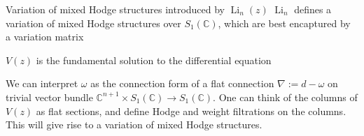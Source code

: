 \documentclass[8pt]{beamer}
\DeclareMathOperator{\Li}{Li}
\theoremstyle{definition}
\theoremstyle{remark}
\begin{document}
\begin{frame}[t]{Variation of mixed Hodge structures introduced by $\Li_n(z)$}
$\operatorname{Li}_n$ defines a variation of mixed Hodge structures over $S_1(\mathbb C)$, which are best encaptured by a variation matrix
\begin{center}
\end{center}
$V(z)$ is the fundamental solution to the differential equation
\begin{center}
\end{center}
We can interpret $\omega$ as the connection form of a flat connection $\nabla:=d-\omega$ on trivial vector bundle $\mathbb C^{n+1}\times S_1(\mathbb C)\to S_1(\mathbb C)$. One can think of the columns of $V(z)$ as flat sections, and define Hodge and weight filtrations on the columns. This will give rise to a variation of mixed Hodge structures.
\end{frame}
\end{document}
